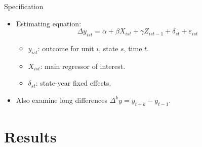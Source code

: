 \documentclass[notes=hide,subsection=false]{beamer}
\begin{document}
\begin{frame}{Specification}
    \begin{itemize}
        \item Estimating equation:
        \[
            \Delta y_{ist} = \alpha + \beta X_{ist} + \gamma Z_{ist-1} + \delta_{st} + \varepsilon_{ist}
        \]
        \begin{itemize}
            \item $y_{ist}$: outcome for unit $i$, state $s$, time $t$.
            \item $X_{ist}$: main regressor of interest.
            \item $\delta_{st}$: state-year fixed effects.
        \end{itemize}
        \item Also examine long differences $\Delta^{k} y = y_{t+k} - y_{t-1}$.
    \end{itemize}
\end{frame}

\section{Results}
\end{document}
